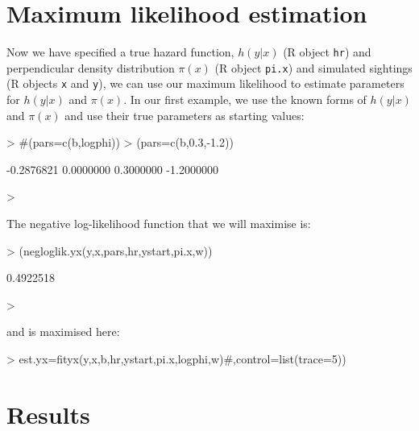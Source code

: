 \documentclass{article}
\begin{document}
\section{Maximum likelihood estimation}
Now we have specified a true hazard function, $h(y|x)$ (R object \texttt{hr}) and perpendicular density distribution $\pi(x)$ (R object \texttt{pi.x}) and simulated sightings (R objects \texttt{x} and \texttt{y}), we can use our maximum likelihood to estimate parameters for $h(y|x)$ and $\pi(x)$.  In our first example, we use the known forms of $h(y|x)$ and $\pi(x)$ and use their true parameters as starting values:
\begin{Schunk}
\begin{Sinput}
> #(pars=c(b,logphi))
> (pars=c(b,0.3,-1.2))
\end{Sinput}
\begin{Soutput}
[1] -0.2876821  0.0000000  0.3000000 -1.2000000
\end{Soutput}
\begin{Sinput}
> 
\end{Sinput}
\end{Schunk}

The negative log-likelihood function that we will maximise is:
\begin{Schunk}
\begin{Sinput}
> (negloglik.yx(y,x,pars,hr,ystart,pi.x,w))
\end{Sinput}
\begin{Soutput}
[1] 0.4922518
\end{Soutput}
\begin{Sinput}
> 
\end{Sinput}
\end{Schunk}
and is maximised here:
\begin{Schunk}
\begin{Sinput}
> est.yx=fityx(y,x,b,hr,ystart,pi.x,logphi,w)#,control=list(trace=5))
\end{Sinput}
\end{Schunk}
\section{Results}
\end{document}
